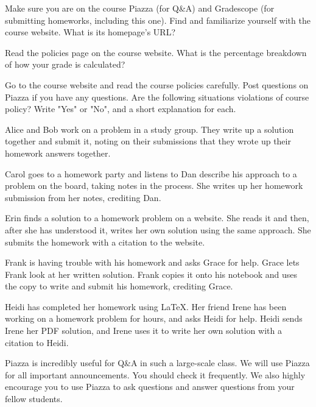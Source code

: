 
\begin{Parts}

\Part Make sure you are on the course Piazza (for Q\&A) and Gradescope (for submitting homeworks, including this one). Find and familiarize yourself with the course website. What is its homepage's URL?

\Part Read the policies page on the course website.  What is the percentage breakdown of how your grade is calculated?

\end{Parts}


Go to the course website and read the course policies carefully. Post questions on Piazza if you have any questions. Are the following situations violations of course policy? Write "Yes" or "No", and a short explanation for each.

\begin{Parts}
  \Part Alice and Bob work on a problem in a study group. They write up a solution together and submit it, noting on their submissions that they wrote up their homework answers together. 
  \nosolspace{3cm}
  
  \Part Carol goes to a homework party and listens to Dan describe his approach to a problem on the board, taking notes in the process. She writes up her homework submission from her notes, crediting Dan.
  \nosolspace{3cm}
  
  \Part Erin finds a solution to a homework problem on a website. She reads it and then, after she has understood it, writes her own solution using the same approach. She submits the homework with a citation to the website.
  \nosolspace{3cm}
  
  \Part Frank is having trouble with his homework and asks Grace for help. Grace lets Frank look at her written solution. Frank copies it onto his notebook and uses the copy to write and submit his homework, crediting Grace.
  \nosolspace{3cm}
  
  \Part Heidi has completed her homework using \LaTeX. Her friend Irene has been working on a homework problem for hours, and asks Heidi for help. Heidi sends Irene her PDF solution, and Irene uses it to write her own solution with a citation to Heidi.
  
\end{Parts}



Piazza is incredibly useful for Q\&A in such a large-scale class. We will use Piazza for all important announcements. You should check it frequently. We also highly encourage you to use Piazza to ask  questions and answer questions from your fellow students.

